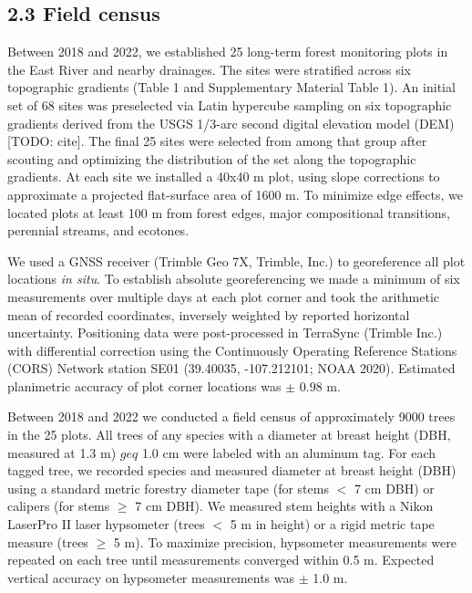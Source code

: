 \documentclass[
  12pt,
]{article}
\begin{document}
\subsection{2.3 Field census}\label{field-census}

Between 2018 and 2022, we established 25 long-term forest monitoring
plots in the East River and nearby drainages. The sites were stratified
across six topographic gradients (Table 1 and Supplementary Material
Table 1). An initial set of 68 sites was preselected via Latin hypercube
sampling on six topographic gradients derived from the USGS 1/3-arc
second digital elevation model (DEM) {[}TODO: cite{]}. The final 25
sites were selected from among that group after scouting and optimizing
the distribution of the set along the topographic gradients. At each
site we installed a 40x40 m plot, using slope corrections to approximate
a projected flat-surface area of 1600 m. To minimize edge effects, we
located plots at least 100 m from forest edges, major compositional
transitions, perennial streams, and ecotones.

We used a GNSS receiver (Trimble Geo 7X, Trimble, Inc.) to georeference
all plot locations \emph{in situ}. To establish absolute georeferencing
we made a minimum of six measurements over multiple days at each plot
corner and took the arithmetic mean of recorded coordinates, inversely
weighted by reported horizontal uncertainty. Positioning data were
post-processed in TerraSync (Trimble Inc.) with differential correction
using the Continuously Operating Reference Stations (CORS) Network
station SE01 (39.40035, -107.212101; NOAA 2020). Estimated planimetric
accuracy of plot corner locations was \(\pm\) 0.98 m.

Between 2018 and 2022 we conducted a field census of approximately 9000
trees in the 25 plots. All trees of any species with a diameter at
breast height (DBH, measured at 1.3 m) \(geq\) 1.0 cm were labeled with
an aluminum tag. For each tagged tree, we recorded species and measured
diameter at breast height (DBH) using a standard metric forestry
diameter tape (for stems \(\lt\) 7 cm DBH) or calipers (for stems
\(\geq\) 7 cm DBH). We measured stem heights with a Nikon LaserPro II
laser hypsometer (trees \(\lt\) 5 m in height) or a rigid metric tape
measure (trees \(\geq\) 5 m). To maximize precision, hypsometer
measurements were repeated on each tree until measurements converged
within 0.5 m. Expected vertical accuracy on hypsometer measurements was
\(\pm\) 1.0 m.
\end{document}
